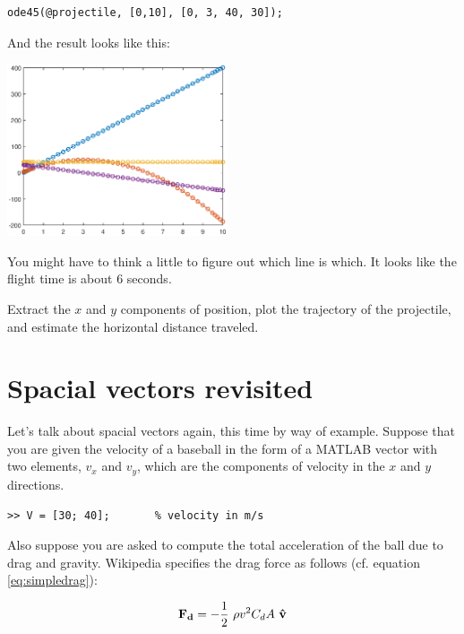 \documentclass[
]{book}
\renewcommand{\vec}[1]{\bm{\mathbf{#1}}}
\newcommand{\uveci}{{\bm{\hat{\textnormal{\bfseries\i}}}}}
\newcommand{\uvecj}{{\bm{\hat{\textnormal{\bfseries\j}}}}}
\newcommand{\uvec}[1]{%
    \ifthenelse{\equal{#1}{i}}%
        {\uveci}{%
    \ifthenelse{\equal{#1}{j}}%
        {\uvecj}{%
    {\bm{\hat{\mathbf{#1}}}}%
}}}
\begin{document}
\begin{verbatim}
ode45(@projectile, [0,10], [0, 3, 40, 30]);
\end{verbatim}

And the result looks like this:

\beforefig \centerline{\includegraphics[height=2in]{figs/proj1_10s.eps}}

You might have to think a little to figure out which line is
which.  It looks like the flight time is about 6 seconds.

\begin{ex}
Extract the $x$ and $y$ components of
position, plot the trajectory of the projectile, and estimate the
horizontal distance traveled.
\end{ex}


\section{Spacial vectors revisited}
\label{sect:spacialre}

Let's talk about spacial vectors again, this time by way of example.
Suppose that you are given the velocity of a baseball in the form of a
MATLAB vector with two elements, $v_x$ and $v_y$, which are the
components of velocity in the $x$ and $y$ directions.

\begin{verbatim}
>> V = [30; 40];       % velocity in m/s
\end{verbatim}

Also suppose you are asked to compute the total acceleration of the ball
due to drag and gravity. Wikipedia specifies the drag force as follows
(cf. equation \eqref{eq:simpledrag}):

\begin{equation}\label{eq:wikidrag}
    \vec{F_d} = - \frac{1}{2} ~ \rho v^2 C_d A ~ \uvec{v}
\end{equation}
\end{document}
